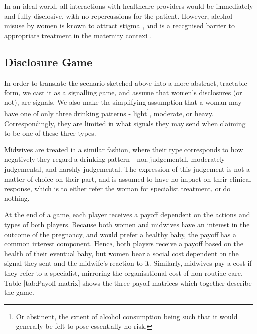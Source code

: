 In an ideal world, all interactions with healthcare providers would be immediately and fully disclosive, with no repercussions for the patient. However, alcohol misuse by women is known to attract stigma \citep{Gomberg1988}, and is a recognised barrier to appropriate treatment in the maternity context \citep{NICE2010,Radcliffe2011}.

\subsection{Disclosure Game}
\label{sub:the_game}

In order to translate the scenario sketched above into a more abstract, tractable form, we cast it as a signalling game, and assume that women's disclosures (or not), are signals. We also make the simplifying assumption that a woman may have one of only three drinking patterns - light\footnote{Or abstinent, the extent of alcohol consumption being such that it would generally be felt to pose essentially no risk.}, moderate, or heavy. Correspondingly, they are limited in what signals they may send when claiming to be one of these three types. 

Midwives are treated in a similar fashion, where their type corresponds to how negatively they regard a drinking pattern - non-judgemental, moderately judgemental, and harshly judgemental. The expression of this judgement is not a matter of choice on their part, and is assumed to have no impact on their clinical response, which is to either refer the woman for specialist treatment, or do nothing.

At the end of a game, each player receives a payoff dependent on the actions and types of both players. Because both women and midwives have an interest in the outcome of the pregnancy, and would prefer a healthy baby, the payoff has a common interest component. Hence, both players receive a payoff based on the health of their eventual baby, but women bear a social cost dependent on the signal they sent and the midwife's reaction to it. Similarly, midwives pay a cost if they refer to a specialist, mirroring the organisational cost of non-routine care. Table \ref{tab:Payoff-matrix} shows the three payoff matrices which together describe the game.

